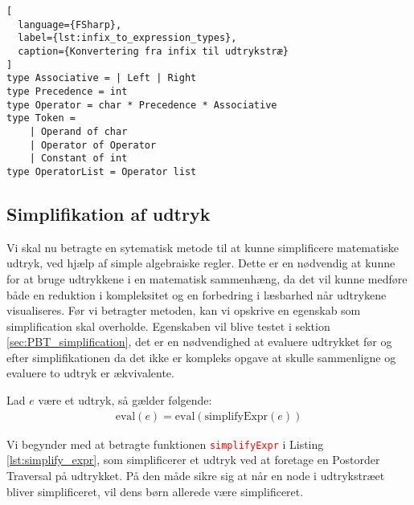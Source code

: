 \documentclass{article}
\begin{document}
\begin{lstlisting}[
  language={FSharp}, 
  label={lst:infix_to_expression_types}, 
  caption={Konvertering fra infix til udtrykstræ}
]
type Associative = | Left | Right
type Precedence = int
type Operator = char * Precedence * Associative
type Token =
    | Operand of char
    | Operator of Operator
    | Constant of int
type OperatorList = Operator list
\end{lstlisting}




\subsection{Simplifikation af udtryk} \label{sec:simplification_expression}
Vi skal nu betragte en sytematisk metode til at kunne simplificere matematiske udtryk, ved hjælp af simple algebraiske regler. Dette er en nødvendig at kunne for at bruge udtrykkene i en matematisk sammenhæng, da det vil kunne medføre både en reduktion i kompleksitet og en forbedring i læsbarhed når udtrykene visualiseres. Før vi betragter metoden, kan vi opskrive en egenskab som simplification skal overholde. Egenskaben vil blive testet i sektion \ref{sec:PBT_simplification}, det er en nødvendighed at evaluere udtrykket før og efter simplifikationen da det ikke er kompleks opgave at skulle sammenligne og evaluere to udtryk er ækvivalente.
\vspace{0.5cm}
\begin{egenskab}\label{egenskab:simplification}
Lad $e$ være et udtryk, så gælder følgende:
\begin{align*}
  \text{eval}(e) = \text{eval}(\text{simplifyExpr}(e))
\end{align*}
\end{egenskab}

Vi begynder med at betragte funktionen \textcolor{red}{\texttt{simplifyExpr}} i Listing \ref{lst:simplify_expr}, som simplificerer et udtryk ved at foretage en Postorder Traversal på udtrykket. På den måde sikre sig at når en node i udtrykstræet bliver simplificeret, vil dens børn allerede være simplificeret. 
\end{document}

